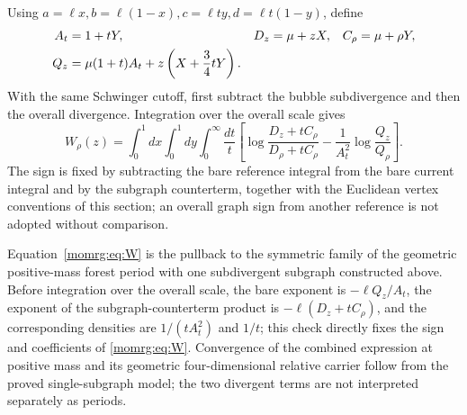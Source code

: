 \documentclass[11pt,a4paper,oneside]{article}
\theoremstyle{plain}
\theoremstyle{definition}
\theoremstyle{remark}
\numberwithin{equation}{section}
\begin{document}
Using $a=\ell x,b=\ell(1-x),c=\ell t y,d=\ell t(1-y)$, define
\begin{align}
 A_t&=1+tY,& D_z&=\mu+zX,& C_\rho&=\mu+\rho Y, \notag\\
 Q_z&=\mu(1+t)A_t+z\left(X+\frac34tY\right).
                                                        \label{momrg:eq:Q}
\end{align}
With the same Schwinger cutoff, first subtract the bubble subdivergence and then the overall divergence.
Integration over the overall scale gives
\begin{equation}\label{momrg:eq:W}
 W_\rho(z)=\int_0^1dx\int_0^1dy\int_0^\infty\frac{dt}{t}
 \left[
  \log\frac{D_z+tC_\rho}{D_\rho+tC_\rho}
  -\frac1{A_t^2}\log\frac{Q_z}{Q_\rho}
 \right].
\end{equation}
The sign is fixed by subtracting the bare reference integral from the bare current integral and by the subgraph counterterm,
together with the Euclidean vertex conventions of this section; an overall graph sign from another reference is not adopted without comparison.

Equation~\eqref{momrg:eq:W} is the pullback to the symmetric family of the geometric positive-mass forest period with one subdivergent subgraph constructed above.
Before integration over the overall scale, the bare exponent is $-\ell Q_z/A_t$,
the exponent of the subgraph-counterterm product is $-\ell(D_z+tC_\rho)$,
and the corresponding densities are $1/(tA_t^2)$ and $1/t$;
this check directly fixes the sign and coefficients of \eqref{momrg:eq:W}.
Convergence of the combined expression at positive mass and its geometric four-dimensional relative carrier follow from the proved single-subgraph model;
the two divergent terms are not interpreted separately as periods.
\end{document}
